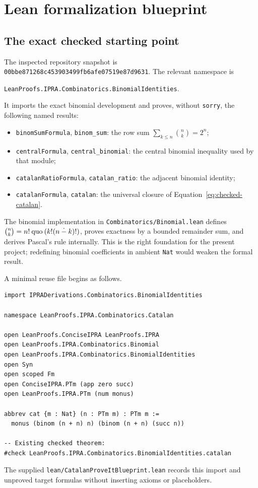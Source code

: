 \section{Lean formalization blueprint}
\label{sec:formalization}

\subsection{The exact checked starting point}

The inspected repository snapshot is
\texttt{00bbe871268c453903499fb6afe07519e87d9631}.  The relevant namespace is
\begin{center}
\texttt{LeanProofs.IPRA.Combinatorics.BinomialIdentities}.
\end{center}
It imports the exact binomial development and proves, without
\texttt{sorry}, the following named results:
\begin{itemize}[leftmargin=2em]
\item \texttt{binomSumFormula}, \texttt{binom\_sum}: the row sum
      $\sum_{k\le n}\binom nk=2^n$;
\item \texttt{centralFormula}, \texttt{central\_binomial}: the central
      binomial inequality used by that module;
\item \texttt{catalanRatioFormula}, \texttt{catalan\_ratio}: the adjacent
      binomial identity;
\item \texttt{catalanFormula}, \texttt{catalan}: the universal closure of
      Equation~\eqref{eq:checked-catalan}.
\end{itemize}
The binomial implementation in
\texttt{Combinatorics/Binomial.lean} defines
\(\binom nk=n!\mathbin{\mathrm{quo}}(k!(n\mathbin{\mathop{\dot{-}}} k)!)\), proves exactness by a
bounded remainder sum, and derives Pascal's rule internally.  This is the
right foundation for the present project; redefining binomial coefficients in
ambient \texttt{Nat} would weaken the formal result.

A minimal reuse file begins as follows.
\begin{lstlisting}[language={},caption={Checked base import and Catalan term}]
import IPRADerivations.Combinatorics.BinomialIdentities

namespace LeanProofs.IPRA.Combinatorics.Catalan

open LeanProofs.ConciseIPRA LeanProofs.IPRA
open LeanProofs.IPRA.Combinatorics.Binomial
open LeanProofs.IPRA.Combinatorics.BinomialIdentities
open Syn
open scoped Fm
open ConciseIPRA.PTm (app zero succ)
open LeanProofs.IPRA.PTm (num monus)

abbrev cat {m : Nat} (n : PTm m) : PTm m :=
  monus (binom (n + n) n) (binom (n + n) (succ n))

-- Existing checked theorem:
#check LeanProofs.IPRA.Combinatorics.BinomialIdentities.catalan
\end{lstlisting}
The supplied \texttt{lean/CatalanProveItBlueprint.lean} records this import and
unproved target formulas without inserting axioms or placeholders.

